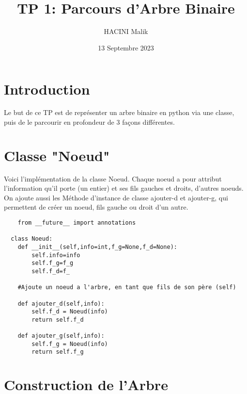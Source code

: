 \documentclass{article}
\title{TP 1: Parcours d'Arbre Binaire}
\author{HACINI Malik}
\date{13 Septembre 2023}
\begin{document}
\maketitle
\tableofcontents{}

\section{Introduction}

Le but de ce TP est de représenter un arbre binaire en python via une classe,
puis de le parcourir en profondeur de 3 façons différentes.




\section{Classe "Noeud"}
Voici l'implémentation de la classe Noeud.
Chaque noeud a pour attribut l'information qu'il porte (un entier) 
et ses fils gauches et droits, d'autres noeuds.
On ajoute aussi les Méthode d'instance de classe ajouter-d et ajouter-g, qui
permettent de créer un noeud, fils gauche ou droit d'un autre.

\renewcommand{\theFancyVerbLine}{
  \sffamily\textcolor[rgb]{0.5,0.5,0.5}{\scriptsize\arabic{FancyVerbLine}}}

\begin{verbatim}
    from __future__ import annotations

  class Noeud:
    def __init__(self,info=int,f_g=None,f_d=None):
        self.info=info
        self.f_g=f_g
        self.f_d=f_
        
    #Ajoute un noeud a l'arbre, en tant que fils de son père (self)

    def ajouter_d(self,info):
        self.f_d = Noeud(info)
        return self.f_d
    
    def ajouter_g(self,info):
        self.f_g = Noeud(info)
        return self.f_g

\end{verbatim}

\section{Construction de l'Arbre}
\end{document}
